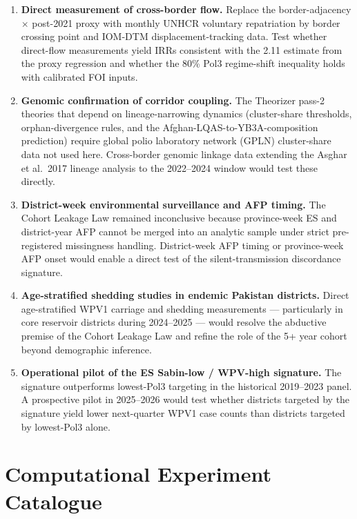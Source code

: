 \documentclass[11pt]{article}
\begin{document}
\begin{enumerate}[noitemsep]
\item \textbf{Direct measurement of cross-border flow.} Replace the border-adjacency $\times$ post-2021 proxy with monthly UNHCR voluntary repatriation by border crossing point and IOM-DTM displacement-tracking data. Test whether direct-flow measurements yield IRRs consistent with the 2.11 estimate from the proxy regression and whether the 80\% Pol3 regime-shift inequality holds with calibrated FOI inputs.
\item \textbf{Genomic confirmation of corridor coupling.} The Theorizer pass-2 theories that depend on lineage-narrowing dynamics (cluster-share thresholds, orphan-divergence rules, and the Afghan-LQAS-to-YB3A-composition prediction) require global polio laboratory network (GPLN) cluster-share data not used here. Cross-border genomic linkage data extending the Asghar et al.\ 2017 lineage analysis to the 2022--2024 window would test these directly.
\item \textbf{District-week environmental surveillance and AFP timing.} The Cohort Leakage Law remained inconclusive because province-week ES and district-year AFP cannot be merged into an analytic sample under strict pre-registered missingness handling. District-week AFP timing or province-week AFP onset would enable a direct test of the silent-transmission discordance signature.
\item \textbf{Age-stratified shedding studies in endemic Pakistan districts.} Direct age-stratified WPV1 carriage and shedding measurements --- particularly in core reservoir districts during 2024--2025 --- would resolve the abductive premise of the Cohort Leakage Law and refine the role of the 5+ year cohort beyond demographic inference.
\item \textbf{Operational pilot of the ES Sabin-low / WPV-high signature.} The signature outperforms lowest-Pol3 targeting in the historical 2019--2023 panel. A prospective pilot in 2025--2026 would test whether districts targeted by the signature yield lower next-quarter WPV1 case counts than districts targeted by lowest-Pol3 alone.
\end{enumerate}

\appendix

\section{Computational Experiment Catalogue}
\label{app:experiments}
\end{document}
